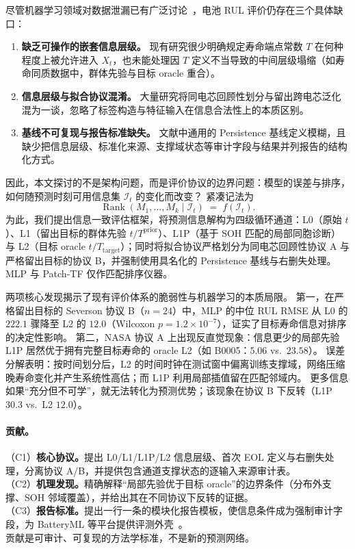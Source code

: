 \documentclass[UTF8,a4paper,12pt]{ctexart}
\begin{document}
尽管机器学习领域对数据泄漏已有广泛讨论~\cite{kaufman2012leakage,kapoor2023leakage}，电池 RUL 评价仍存在三个具体缺口：
\begin{enumerate}
\item \textbf{缺乏可操作的嵌套信息层级。}
现有研究很少明确规定寿命端点常数 $T$ 在何种程度上被允许进入 $X_t$，也未能处理因 $T$ 定义不当导致的中间层级塌缩（如寿命同质数据中，群体先验与目标 oracle 重合）。
\item \textbf{信息层级与拟合协议混淆。}
大量研究将同电芯回顾性划分与留出跨电芯泛化混为一谈，忽略了标签构造与特征输入在信息合法性上的本质区别。
\item \textbf{基线不可复现与报告标准缺失。}
文献中通用的 Persistence 基线定义模糊，且缺少把信息层级、标准化来源、支撑域状态等审计字段与结果并列报告的结构化方式。
\end{enumerate}

因此，本文探讨的不是架构问题，而是评价协议的边界问题：模型的误差与排序，如何随预测时刻可用信息集 $\mathcal{I}_t$ 的变化而改变？
紧凑记法为
\begin{equation}
\boxed{\operatorname{Rank}(M_1,\ldots,M_k\mid \mathcal{I}_t)\;=\;f(\mathcal{I}_t).}
\end{equation}
为此，我们提出信息一致评估框架，将预测信息解构为四级循环通道：L0（原始 $t$）、L1（留出目标的群体先验 $t/T^{\mathrm{prior}}$）、L1P（基于 SOH 匹配的局部同胞诊断）与 L2（目标 oracle $t/T_{\mathrm{target}}$）；同时将拟合协议严格划分为同电芯回顾性协议 A 与严格留出目标的协议 B，并强制使用具名化的 Persistence 基线与右删失处理。
MLP 与 Patch-TF 仅作匹配排序仪器。

两项核心发现揭示了现有评价体系的脆弱性与机器学习的本质局限。
第一，在严格留出目标的 Severson 协议 B（$n{=}24$）中，MLP 的中位 RUL RMSE 从 L0 的 $222.1$ 骤降至 L2 的 $12.0$（Wilcoxon $p=1.2{\times}10^{-7}$），证实了目标寿命信息对排序的决定性影响。
第二，NASA 协议 A 上出现反直觉现象：信息更少的局部先验 L1P 居然优于拥有完整目标寿命的 oracle L2（如 B0005：$5.06$ vs.\ $23.58$）。
误差分解表明：按时间划分后，L2 的时间时钟在测试窗中偏离训练支撑域，网络压缩晚寿命变化并产生系统性高估；而 L1P 利用局部插值留在匹配邻域内。
更多信息如果``充分但不可学''，就无法转化为预测优势；该现象在协议 B 下反转（L1P $30.3$ vs.\ L2 $12.0$）。

\paragraph{贡献。}
（C1）\textbf{核心协议。}提出 L0/L1/L1P/L2 信息层级、首次 EOL 定义与右删失处理，分离协议 A/B，并提供包含通道支撑状态的逐输入来源审计表。\\
（C2）\textbf{机理发现。}精确解释``局部先验优于目标 oracle''的边界条件（分布外支撑、SOH 邻域覆盖），并给出其在不同协议下反转的证据。\\
（C3）\textbf{报告标准。}提出一行一条的模块化报告模板，使信息条件成为强制审计字段，为 BatteryML 等平台提供评测外壳~\cite{zhang2024batteryml}。\\
贡献是可审计、可复现的方法学标准，不是新的预测网络。
\end{document}
